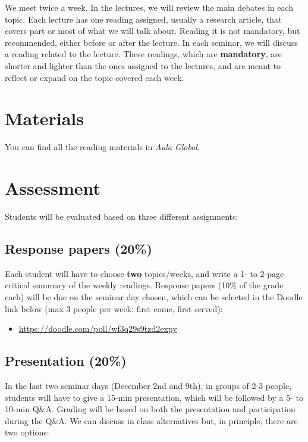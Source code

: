 \documentclass[12pt, a4paper]{article}
\begin{document}
We meet twice a week. In the lectures, we will review the main debates in each topic. Each lecture has one reading assigned, usually a research article, that covers part or most of what we will talk about. Reading it is not mandatory, but recommended, either before or after the lecture. In each seminar, we will discuss a reading related to the lecture. These readings, which are \textbf{mandatory}, are shorter and lighter than the ones assigned to the lectures, and are meant to reflect or expand on the topic covered each week.

\section{Materials}

You can find all the reading materials in \textit{Aula Global}.

\newpage
\section{Assessment}

Students will be evaluated based on three different assignments:

\subsection*{Response papers (20\%)}

Each student will have to choose \textbf{two} topics/weeks, and write a 1- to 2-page critical summary of the weekly readings. Response papers (10\% of the grade each) will be due on the seminar day chosen, which can be selected in the Doodle link below (max 3 people per week: first come, first served):

\begin{itemize}
\setlength\itemsep{0pt}
\item[] \href{https://doodle.com/poll/wf3q29s9tzd2expy}{https://doodle.com/poll/wf3q29s9tzd2expy}
\end{itemize}

\subsection*{Presentation (20\%)}

In the last two seminar days (December 2nd and 9th), in groups of 2-3 people, students will have to give a 15-min presentation, which will be followed by a 5- to 10-min Q\&A. Grading will be based on both the presentation and participation during the Q\&A. We can discuss in class alternatives but, in principle, there are two options:
\end{document}
